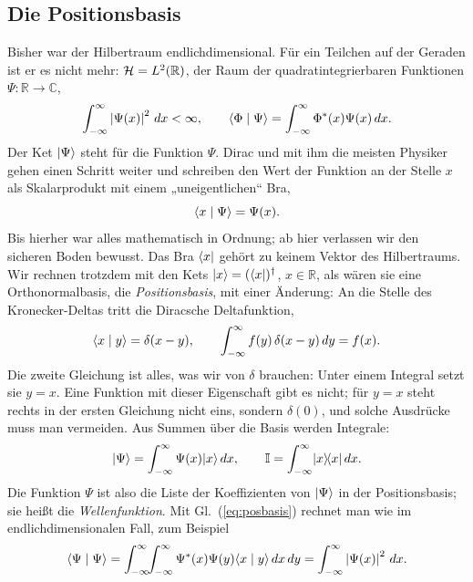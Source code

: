 \subsection{Die Positionsbasis}
Bisher war der Hilbertraum endlichdimensional. Für ein Teilchen auf der Geraden ist er es nicht mehr: $\mathcal{H} = L^2(\mathbb{R})$, der Raum der quadratintegrierbaren Funktionen $\Psi:\mathbb{R}\to\mathbb{C}$,
\begin{equation}
	\int_{-\infty}^{\infty} \left\lvert \Psi(x) \right\rvert^2\,dx < \infty, \qquad \langle \Phi \mid \Psi \rangle = \int_{-\infty}^{\infty} \Phi^*(x)\Psi(x)\,dx.
\end{equation}
Der Ket $\lvert \Psi \rangle$ steht für die Funktion $\Psi$. Dirac und mit ihm die meisten Physiker gehen einen Schritt weiter und schreiben den Wert der Funktion an der Stelle $x$ als Skalarprodukt mit einem „uneigentlichen“ Bra,
\begin{equation}
	\langle x \mid \Psi \rangle = \Psi(x).
\end{equation}
Bis hierher war alles mathematisch in Ordnung; ab hier verlassen wir den sicheren Boden bewusst. Das Bra $\langle x \rvert$ gehört zu keinem Vektor des Hilbertraums. Wir rechnen trotzdem mit den Kets $\lvert x \rangle = (\langle x \rvert)^{\dagger}$, $x\in\mathbb{R}$, als wären sie eine Orthonormalbasis, die \emph{Positionsbasis}, mit einer Änderung: An die Stelle des Kronecker-Deltas tritt die Diracsche Deltafunktion,
\begin{equation}\label{eq:posbasis}
	\langle x \mid y \rangle = \delta(x-y), \qquad \int_{-\infty}^{\infty} f(y)\,\delta(x-y)\,dy = f(x).
\end{equation}
Die zweite Gleichung ist alles, was wir von $\delta$ brauchen: Unter einem Integral setzt sie $y = x$. Eine Funktion mit dieser Eigenschaft gibt es nicht; für $y = x$ steht rechts in der ersten Gleichung nicht eins, sondern $\delta(0)$, und solche Ausdrücke muss man vermeiden. Aus Summen über die Basis werden Integrale:
\begin{equation}\label{eq:posentwicklung}
	\lvert \Psi \rangle = \int_{-\infty}^{\infty} \Psi(x)\lvert x \rangle\,dx, \qquad \mathbb{I} = \int_{-\infty}^{\infty} \lvert x \rangle\!\langle x \rvert\,dx.
\end{equation}
Die Funktion $\Psi$ ist also die Liste der Koeffizienten von $\lvert \Psi \rangle$ in der Positionsbasis; sie heißt die \emph{Wellenfunktion}. Mit Gl.~(\ref{eq:posbasis}) rechnet man wie im endlichdimensionalen Fall, zum Beispiel
\begin{equation}
	\langle \Psi \mid \Psi \rangle = \int_{-\infty}^{\infty}\!\!\int_{-\infty}^{\infty} \Psi^*(x)\Psi(y)\langle x \mid y \rangle\,dx\,dy = \int_{-\infty}^{\infty} \left\lvert \Psi(x) \right\rvert^2\,dx.
\end{equation}

